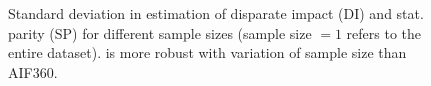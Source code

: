 \begin{figure}
	\centering
	
	\caption[Robustness of fairness verification]{Standard deviation in estimation of disparate impact (DI) and stat. parity (SP)  for different sample sizes (sample size $ = 1 $ refers to the entire dataset). {\justicia} is more robust with variation of sample size than  AIF360. }
	\label{fairness_justicia_fig:sample-size}
\end{figure}



